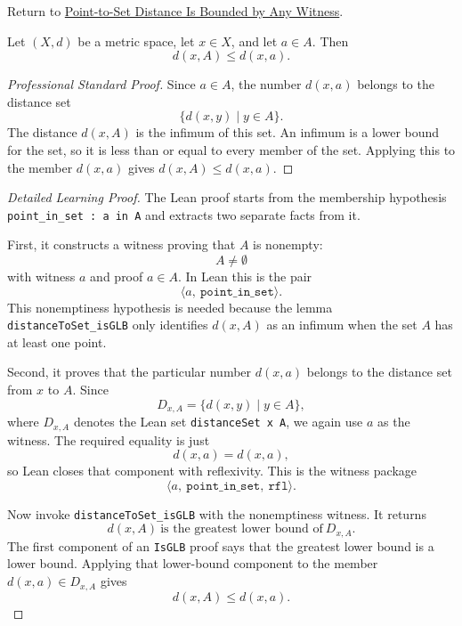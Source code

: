 \newpage
{}
\label{prf:fv-msml-distance-to-set-le-distance-to-point-of-mem}

\begin{remark*}[Return]
Return to \hyperref[thm:fv-msml-distance-to-set-le-distance-to-point-of-mem]{Point-to-Set Distance Is Bounded by Any Witness}.
\end{remark*}

\begin{theorem*}
Let $(X,d)$ be a metric space, let \(x\in X\), and let \(a\in A\). Then
\[
  d(x,A)\leq d(x,a).
\]
\end{theorem*}

\begin{proof}[Professional Standard Proof]
\LRAProofBodyStart
Since \(a\in A\), the number \(d(x,a)\) belongs to the distance set
\[
  \{d(x,y)\mid y\in A\}.
\]
The distance \(d(x,A)\) is the infimum of this set. An infimum is a lower bound
for the set, so it is less than or equal to every member of the set. Applying
this to the member \(d(x,a)\) gives \(d(x,A)\leq d(x,a)\).
\end{proof}

\begin{proof}[Detailed Learning Proof]
\LRAProofBodyStart
The Lean proof starts from the membership hypothesis
\texttt{point\_in\_set : a in A} and extracts two separate facts from it.

First, it constructs a witness proving that \(A\) is nonempty:
\[
  A\neq\emptyset
\]
with witness \(a\) and proof \(a\in A\). In Lean this is the pair
\[
  \langle a,\ \texttt{point\_in\_set}\rangle.
\]
This nonemptiness hypothesis is needed because the lemma
\texttt{distanceToSet\_isGLB} only identifies \(d(x,A)\) as an infimum when
the set \(A\) has at least one point.

Second, it proves that the particular number \(d(x,a)\) belongs to the
distance set from \(x\) to \(A\). Since
\[
  D_{x,A}
  =
  \{d(x,y)\mid y\in A\},
\]
where \(D_{x,A}\) denotes the Lean set \texttt{distanceSet x A},
we again use \(a\) as the witness. The required equality is just
\[
  d(x,a)=d(x,a),
\]
so Lean closes that component with reflexivity. This is the witness package
\[
  \langle a,\ \texttt{point\_in\_set},\ \texttt{rfl}\rangle.
\]

Now invoke \texttt{distanceToSet\_isGLB} with the nonemptiness witness. It
returns
\[
  d(x,A)\ \text{is the greatest lower bound of}\ D_{x,A}.
\]
The first component of an \texttt{IsGLB} proof says that the greatest lower
bound is a lower bound. Applying that lower-bound component to the member
\(d(x,a)\in D_{x,A}\) gives
\[
  d(x,A)\leq d(x,a).
\]
\end{proof}

